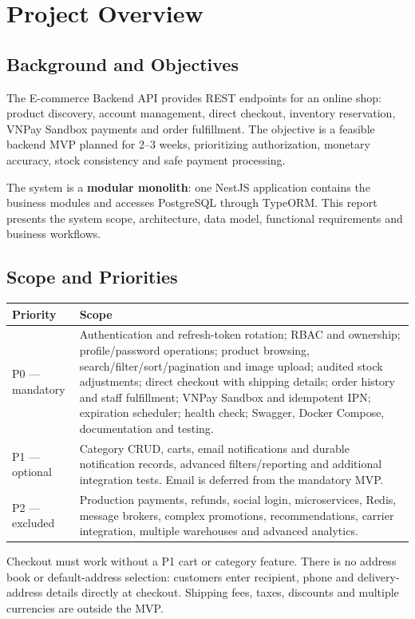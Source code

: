 \chapter{Project Overview}
\section{Background and Objectives}
The E-commerce Backend API provides REST endpoints for an online shop: product discovery, account management, direct checkout, inventory reservation, VNPay Sandbox payments and order fulfillment. The objective is a feasible backend MVP planned for 2--3 weeks, prioritizing authorization, monetary accuracy, stock consistency and safe payment processing.

The system is a \textbf{modular monolith}: one NestJS application contains the business modules and accesses PostgreSQL through TypeORM. This report presents the system scope, architecture, data model, functional requirements and business workflows.

\section{Scope and Priorities}
\begin{tabularx}{\textwidth}{@{}p{24mm}X@{}}
\toprule
Priority & Scope \\
\midrule
P0 --- mandatory & Authentication and refresh-token rotation; RBAC and ownership; profile/password operations; product browsing, search/filter/sort/pagination and image upload; audited stock adjustments; direct checkout with shipping details; order history and staff fulfillment; VNPay Sandbox and idempotent IPN; expiration scheduler; health check; Swagger, Docker Compose, documentation and testing. \\
P1 --- optional & Category CRUD, carts, email notifications and durable notification records, advanced filters/reporting and additional integration tests. Email is deferred from the mandatory MVP. \\
P2 --- excluded & Production payments, refunds, social login, microservices, Redis, message brokers, complex promotions, recommendations, carrier integration, multiple warehouses and advanced analytics. \\
\bottomrule
\end{tabularx}

Checkout must work without a P1 cart or category feature. There is no address book or default-address selection: customers enter recipient, phone and delivery-address details directly at checkout. Shipping fees, taxes, discounts and multiple currencies are outside the MVP.

